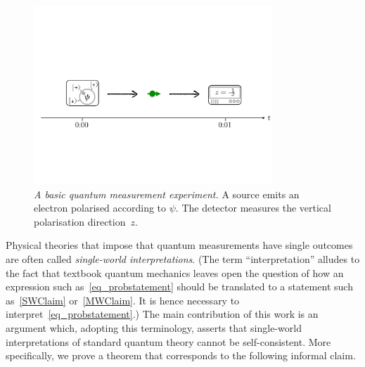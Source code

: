 \documentclass[12pt]{article}
\theoremstyle{plain}
\theoremstyle{definition}
\begin{document}
\begin{figure}[t]
\centering
\includegraphics[trim= 0.4cm  8.6cm 0cm 11cm, clip=true, width=0.8\textwidth]{BasicMeasurement.pdf}
\caption{\emph{A basic quantum measurement experiment.} A  source emits an electron polarised according to $\psi$. The detector measures the vertical polarisation direction~$z$.
\label{fig_basicmeasurement}
}
\end{figure}

Physical theories that impose that quantum measurements have single outcomes are often called \emph{single-world interpretations}. (The term ``interpretation'' alludes to the fact that textbook quantum mechanics leaves open the question of how an expression such as~\eqref{eq_probstatement} should be translated to a statement such as~\eqref{SWClaim} or~\eqref{MWClaim}. It is hence necessary to interpret~\eqref{eq_probstatement}.)  The main contribution of this work is an argument which, adopting this terminology, asserts that single-world interpretations of standard quantum theory cannot be self-consistent.  More specifically, we prove a theorem that corresponds to the following informal claim. 
\end{document}
